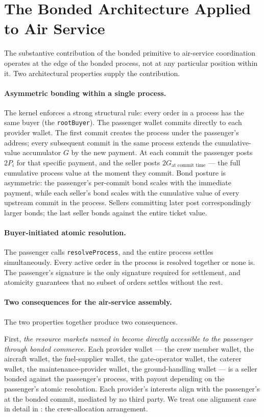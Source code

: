 \documentclass[11pt,a4paper]{article}
\theoremstyle{definition}
\theoremstyle{remark}
\begin{document}
\section{The Bonded Architecture Applied to Air Service}
\label{sec:assembly}

The substantive contribution of the bonded primitive to
air-service coordination operates at the edge of the bonded
process, not at any particular position within it. Two
architectural properties supply the contribution.

\paragraph{Asymmetric bonding within a single process.}
The kernel enforces a strong structural rule: every order in a
process has the same buyer (the \texttt{rootBuyer}). The
passenger wallet commits directly to each provider wallet. The
first commit creates the process under the passenger's address;
every subsequent commit in the same process extends the
cumulative-value accumulator $G$ by the new payment. At each
commit the passenger posts $2P_i$ for that specific payment, and
the seller posts $2G_{\text{at commit time}}$ --- the full
cumulative process value at the moment they commit. Bond posture
is asymmetric: the passenger's per-commit bond scales with the
immediate payment, while each seller's bond scales with the
cumulative value of every upstream commit in the process.
Sellers committing later post correspondingly larger bonds; the
last seller bonds against the entire ticket value.

\paragraph{Buyer-initiated atomic resolution.}
The passenger calls \texttt{resolveProcess}, and the entire
process settles simultaneously. Every active order in the process
is resolved together or none is. The passenger's signature is the
only signature required for settlement, and atomicity guarantees
that no subset of orders settles without the rest.

\paragraph{Two consequences for the air-service assembly.}
The two properties together produce two consequences.

First, \emph{the resource markets named in 
become directly accessible to the passenger through bonded
commerce.} Each provider wallet --- the crew member wallet, the
aircraft wallet, the fuel-supplier wallet, the gate-operator
wallet, the caterer wallet, the maintenance-provider wallet, the
ground-handling wallet --- is a seller bonded against the
passenger's process, with payout depending on the passenger's
atomic resolution. Each provider's interests align with the
passenger's at the bonded commit, mediated by no third party.
We treat one alignment case in detail in :
the crew-allocation arrangement.
\end{document}
